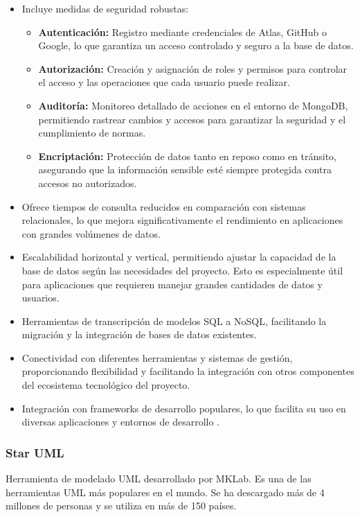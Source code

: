 \documentclass[12pt,twoside]{article}
\begin{document}
	\begin{itemize}
	\item Incluye medidas de seguridad robustas:
		\begin{itemize}
			\item \textbf{Autenticación:} Registro mediante credenciales de Atlas, GitHub o Google, lo que garantiza un acceso controlado y seguro a la base de datos.
			\item \textbf{Autorización:} Creación y asignación de roles y permisos para controlar el acceso y las operaciones que cada usuario puede realizar.
			\item \textbf{Auditoría:} Monitoreo detallado de acciones en el entorno de MongoDB, permitiendo rastrear cambios y accesos para garantizar la seguridad y el cumplimiento de normas.
			\item \textbf{Encriptación:} Protección de datos tanto en reposo como en tránsito, asegurando que la información sensible esté siempre protegida contra accesos no autorizados.
		\end{itemize}
	\item Ofrece tiempos de consulta reducidos en comparación con sistemas relacionales, lo que mejora significativamente el rendimiento en aplicaciones con grandes volúmenes de datos.
	\item Escalabilidad horizontal y vertical, permitiendo ajustar la capacidad de la base de datos según las necesidades del proyecto. Esto es especialmente útil para aplicaciones que requieren manejar grandes cantidades de datos y usuarios.
	\item Herramientas de transcripción de modelos SQL a NoSQL, facilitando la migración y la integración de bases de datos existentes.
	\item Conectividad con diferentes herramientas y sistemas de gestión, proporcionando flexibilidad y facilitando la integración con otros componentes del ecosistema tecnológico del proyecto.
	\item Integración con frameworks de desarrollo populares, lo que facilita su uso en diversas aplicaciones y entornos de desarrollo \cite{lan: mongo}.
\end{itemize}


	\subsubsection{Star UML}
	Herramienta de modelado UML desarrollado por MKLab. Es una de las herramientas UML más populares en el mundo. Se ha descargado más de 4 millones de personas y se utiliza en más de 150 países.
	
\end{document}
